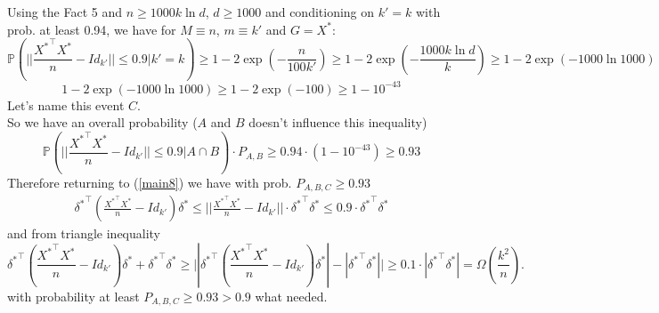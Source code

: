 \documentclass[]{article}
\begin{document}
Using the Fact 5 and $n\ge 1000k\ln{d}$, $d\ge 1000$ and conditioning on $k'=k$ with prob. at least 0.94, we have for $M\equiv n$, $m\equiv k'$ and $G=X^*$:
\begin{equation}
\mathbb{P}\left(||\frac{{X^*}^\top X^*}{n} - Id_{k'}||\le 0.9\bigg\vert k'=k\right) 
\ge
1-2\exp\left(-\frac{n}{100k'}\right)
\ge
1-2\exp\left(-\frac{1000k\ln{d}}{k}\right)
\ge 
1-2\exp\left(-1000\ln{1000}\right)
\end{equation}
\begin{equation}
1-2\exp\left(-1000\ln{1000}\right)\ge 
1-2\exp(-100)\ge 1-10^{-43}
\end{equation}
Let's name this event $C$.\\
So we have an overall probability ($A$ and $B$ doesn't influence this inequality)
\begin{equation}
\mathbb{P}\left(||\frac{{X^*}^\top X^*}{n} - Id_{k'}||\le 0.9\bigg\vert A\cap B\right)\cdot P_{A,B} 
\ge 0.94 \cdot (1-10^{-43}) \ge 0.93
\end{equation}
Therefore returning to (\ref{main8}) we have with prob. $P_{A,B,C}\ge0.93$
\begin{eqnarray}
{\delta^*}^\top\left(\frac{{X^*}^\top X^*}{n} - Id_{k'}\right)\delta^* 
\le \bigg\vert\bigg\vert\frac{{X^*}^\top X^*}{n} - Id_{k'}\bigg\vert\bigg\vert
\cdot {\delta^*}^\top\delta^* \le 0.9\cdot {\delta^*}^\top\delta^*
\end{eqnarray}
and from triangle inequality
\begin{equation}
{\delta^*}^\top\left(\frac{{X^*}^\top X^*}{n} - Id_{k'}\right)\delta^*
+ {\delta^*}^\top\delta^*
\ge \bigg\vert|{\delta^*}^\top\left(\frac{{X^*}^\top X^*}{n} - Id_{k'}\right)\delta^*| - |{\delta^*}^\top\delta^*|\bigg\vert\ge 0.1\cdot |{\delta^*}^\top\delta^*| = \Omega\left(\frac{k^2}{n}\right).
\end{equation}
with probability at least $P_{A,B,C} \ge 0.93>0.9$ what needed.
\end{document}
